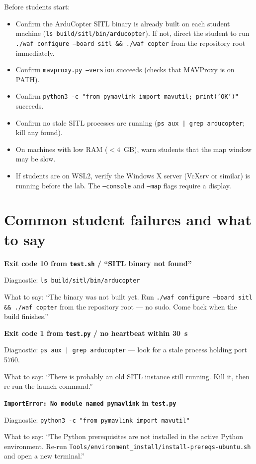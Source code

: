 \documentclass[a4paper,11pt,twoside]{article}
\begin{document}
Before students start:
\begin{itemize}[label={[ ]}]
  \item Confirm the ArduCopter SITL binary is already built on each student machine (\texttt{ls build/sitl/bin/arducopter}). If not, direct the student to run \texttt{./waf configure --board sitl \&\& ./waf copter} from the repository root immediately.
  \item Confirm \texttt{mavproxy.py --version} succeeds (checks that MAVProxy is on PATH).
  \item Confirm \texttt{python3 -c "from pymavlink import mavutil; print('OK')"} succeeds.
  \item Confirm no stale SITL processes are running (\texttt{ps aux | grep arducopter}; kill any found).
  \item On machines with low RAM ($<4$~GB), warn students that the map window may be slow.
  \item If students are on WSL2, verify the Windows X server (VcXsrv or similar) is running before the lab. The \texttt{--console} and \texttt{--map} flags require a display.
\end{itemize}

\section*{Common student failures and what to say}

\textbf{Exit code 10 from \texttt{test.sh} / ``SITL binary not found''}

Diagnostic: \texttt{ls build/sitl/bin/arducopter}

What to say: ``The binary was not built yet. Run \texttt{./waf configure --board sitl \&\& ./waf copter} from the repository root --- no sudo. Come back when the build finishes.''

\textbf{Exit code 1 from \texttt{test.py} / no heartbeat within 30~s}

Diagnostic: \texttt{ps aux | grep arducopter} --- look for a stale process holding port 5760.

What to say: ``There is probably an old SITL instance still running. Kill it, then re-run the launch command.''

\textbf{\texttt{ImportError: No module named pymavlink} in \texttt{test.py}}

Diagnostic: \texttt{python3 -c "from pymavlink import mavutil"}

What to say: ``The Python prerequisites are not installed in the active Python environment. Re-run \texttt{Tools/environment\_install/install-prereqs-ubuntu.sh} and open a new terminal.''
\end{document}
